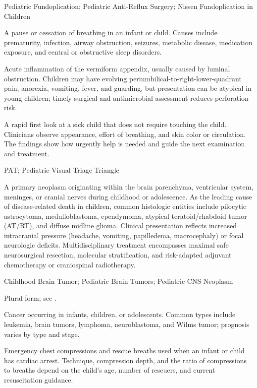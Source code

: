 \synonyms
Pediatric Fundoplication; Pediatric Anti-Reflux Surgery; Nissen Fundoplication in Children

 A pause or cessation of breathing in an infant or child. Causes include prematurity, infection, airway obstruction, seizures, metabolic disease, medication exposure, and central or obstructive sleep disorders.

 Acute inflammation of the vermiform appendix, usually caused by luminal obstruction.
Children may have evolving periumbilical-to-right-lower-quadrant pain, anorexia,
vomiting, fever, and guarding, but presentation can be atypical in young children;
timely surgical and antimicrobial assessment reduces perforation risk.

 A rapid first look at a sick child that does not require touching the child. Clinicians observe appearance, effort of breathing, and skin color or circulation. The findings show how urgently help is needed and guide the next examination and treatment.

\synonyms
PAT; Pediatric Visual Triage Triangle

 A primary neoplasm originating within the brain parenchyma, ventricular system, meninges, or cranial nerves during childhood or adolescence. As the leading cause of disease-related death in children, common histologic entities include pilocytic astrocytoma, medulloblastoma, ependymoma, atypical teratoid/rhabdoid tumor (AT/RT), and diffuse midline glioma. Clinical presentation reflects increased intracranial pressure (headache, vomiting, papilledema, macrocephaly) or focal neurologic deficits. Multidisciplinary treatment encompasses maximal safe neurosurgical resection, molecular stratification, and risk-adapted adjuvant chemotherapy or craniospinal radiotherapy.

\synonyms
Childhood Brain Tumor; Pediatric Brain Tumors; Pediatric CNS Neoplasm

 Plural form; see .

 Cancer occurring in infants, children, or adolescents. Common types include leukemia, brain tumors, lymphoma, neuroblastoma, and Wilms tumor; prognosis varies by type and stage.

 Emergency chest compressions and rescue breaths used when an infant or child has cardiac arrest. Technique, compression depth, and the ratio of compressions to breaths depend on the child's age, number of rescuers, and current resuscitation guidance.


